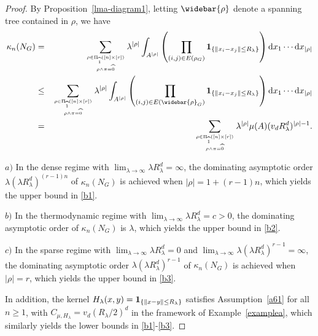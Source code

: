 \documentclass[bj,authoryear,noshowframe]{imsart}
\theoremstyle{plain}
\theoremstyle{remark}
\newcommand{\bone}{{\bf 1}}
\begin{document}
 \begin{proof}
  By Proposition~\ref{lma-diagram1},
  letting $\widebar{\rho}$ denote a spanning tree contained in $\rho$,
   we have 
 \begin{eqnarray}
   \nonumber
   \kappa_n(N_G)&=&\sum_{\rho \in \Pi_{\widehat{1}} ( [n] \times [r])
     \atop
     {\rho \wedge \pi = \widehat{0}}
   }
   \lambda^{|\rho|}\int_{A^{|\rho |}}
   \left(
 \prod_{(i,j) \in E(\rho_G)}
 \bone_{\{\|x_i-x_j\|\leq R_\lambda\}}
 \right)
 \mathrm{d}x_1\cdots\mathrm{d}x_{|\rho|}
 \\
 \nonumber
 &\leq &\sum_{\rho \in \Pi_{\widehat{1}} ( [n] \times [r])
     \atop
     {\rho \wedge \pi = \widehat{0}}
   }
   \lambda^{|\rho|}\int_{A^{|\rho |}}
   \left(
 \prod_{(i,j) \in E(\widebar{\rho}_G)}
 \bone_{\{\|x_i-x_j\|\leq R_\lambda\}}
 \right)
 \mathrm{d}x_1\cdots\mathrm{d}x_{|\rho|}
 \\
 \nonumber
 &=&\sum_{\rho \in \Pi_{\widehat{1}} ( [n] \times [r])
     \atop
     {\rho \wedge \pi = \widehat{0}}
   }
   \lambda^{|\rho|} \mu (A) (v_d R_\lambda^d)^{|\rho|-1}. 
 \end{eqnarray}
  
   \noindent
 $a)$ 
   In the dense regime
   with $\lim_{\lambda\to \infty} \lambda R_\lambda^d = \infty$,
   the dominating asymptotic order 
   $\lambda(\lambda R_\lambda^d)^{(r-1)n}$ of $\kappa_n(N_G)$ is
   achieved when $|\rho|=1+(r-1)n$,
   which yields the upper bound in \eqref{b1}. 
 
 \noindent
 $b)$ 
     In the thermodynamic regime
     with $\lim_{\lambda\to \infty} \lambda R_\lambda^d = c>0$,
     the dominating asymptotic order of $\kappa_n(N_G)$ is $\lambda$,
     which yields the upper bound in \eqref{b2}. 
 
   \noindent
 $c)$ 
     In the sparse regime
     with $\lim_{\lambda\to \infty} \lambda R_\lambda^d = 0$ and
     $\lim_{\lambda\to \infty} \lambda(\lambda R_\lambda^d)^{r-1} = \infty$,
     the dominating asymptotic order $\lambda(\lambda R_\lambda^d)^{r-1}$
     of $\kappa_n(N_G)$ is achieved when $|\rho|=r$, 
     which yields the upper bound in \eqref{b3}. 
 
 
  In addition, the kernel 
  $H_\lambda (x,y)=\bone_{\{\|x-y\|\leq R_\lambda\}}$
  satisfies Assumption~\ref{a61} for all $n\geq 1$,
  with $C_{\mu , H_\lambda} = v_d (R_\lambda /2)^d$
  in the framework of Example~\ref{examplea},
  which similarly yields the lower bounds in 
  \eqref{b1}-\eqref{b3}.
 \end{proof}
\end{document}
